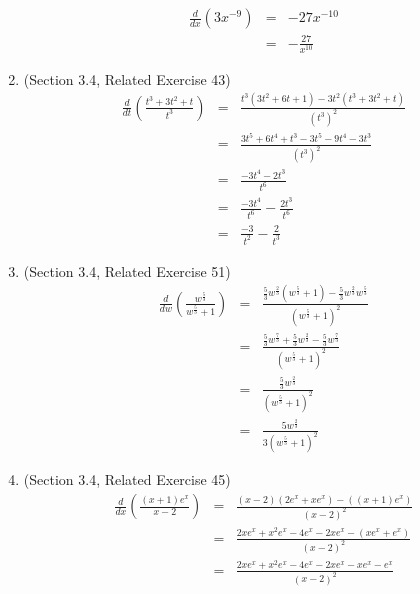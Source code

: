 \documentclass{article}
\begin{document}
\begin{enumerate}
        \begin{eqnarray}
            \frac{d}{dx}\left(3x^{-9}\right) &=& -27x^{-10} \\
                                             &=& -\frac{27}{x^{10}}
        \end{eqnarray}
    \item (Section 3.4, Related Exercise 43)
        \begin{eqnarray}
            \frac{d}{dt}\left(\frac{t^3 + 3t^2 + t}{t^3}\right) &=& \frac{t^3(3t^2 + 6t + 1) - 3t^2(t^3 + 3t^2 + t)}{(t^3)^2} \\
            &=& \frac{3t^5 + 6t^4 + t^3 - 3t^5 - 9t^4 - 3t^3}{(t^3)^2} \\
            &=& \frac{-3t^4 - 2t^3}{t^6} \\
            &=& \frac{-3t^4}{t^6} - \frac{2t^3}{t^6} \\
            &=& \frac{-3}{t^2} - \frac{2}{t^3}
        \end{eqnarray}
    \item (Section 3.4, Related Exercise 51)
        \begin{eqnarray}
            \frac{d}{dw}\left(\frac{w^{\frac{5}{3}}}{w^{\frac{5}{3}} + 1}\right) &=& \frac{\frac{5}{3}w^{\frac{2}{3}}(w^{\frac{5}{3}} + 1) - \frac{5}{3}w^{\frac{2}{3}}w^{\frac{5}{3}}}{\left(w^{\frac{5}{3}} + 1\right)^2} \\
                                                                                 &=& \frac{\frac{5}{3}w^{\frac{7}{3}} + \frac{5}{3}w^{\frac{2}{3}} - \frac{5}{3}w^{\frac{7}{3}}}{\left(w^{\frac{5}{3}} + 1\right)^2} \\
                                                                                 &=& \frac{\frac{5}{3}w^{\frac{2}{3}}}{\left(w^{\frac{5}{3}} + 1\right)^2} \\
                                                                                 &=& \frac{5w^{\frac{2}{3}}}{3\left(w^{\frac{5}{3}} + 1\right)^2}
        \end{eqnarray}
    \item (Section 3.4, Related Exercise 45)
        \begin{eqnarray}
            \frac{d}{dx}\left(\frac{(x + 1)e^x}{x - 2}\right) &=& \frac{(x - 2)(2e^x + xe^x) - ((x+1)e^x)}{(x - 2)^2} \\
            &=& \frac{2xe^x + x^2e^x - 4e^x - 2xe^x - (xe^x + e^x)}{(x - 2)^2} \\
            &=& \frac{2xe^x + x^2e^x - 4e^x - 2xe^x - xe^x - e^x}{(x - 2)^2} \\

\end{eqnarray}
\end{enumerate}
\end{document}
